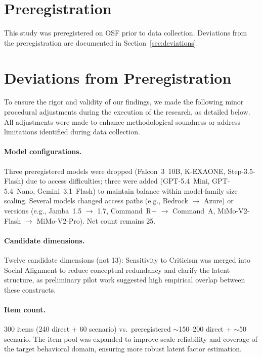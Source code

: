 \documentclass[11pt]{article}
\begin{document}
\section*{Preregistration}

This study was preregistered on OSF prior to data collection.
Deviations from the preregistration are documented in Section~\ref{sec:deviations}.


\section*{Deviations from Preregistration}
\label{sec:deviations}

To ensure the rigor and validity of our findings, we made the following minor procedural adjustments during the execution of the research, as detailed below. All adjustments were made to enhance methodological soundness or address limitations identified during data collection.

\paragraph{Model configurations.}
Three preregistered models were dropped (Falcon~3~10B, K-EXAONE, Step-3.5-Flash) due to access difficulties; three were added (GPT-5.4~Mini, GPT-5.4~Nano, Gemini~3.1~Flash) to maintain balance within model-family size scaling.
Several models changed access paths (e.g., Bedrock $\to$ Azure) or versions (e.g., Jamba~1.5 $\to$ 1.7, Command~R+ $\to$ Command~A, MiMo-V2-Flash $\to$ MiMo-V2-Pro).
Net count remains 25.

\paragraph{Candidate dimensions.}
Twelve candidate dimensions (not 13): Sensitivity to Criticism was merged into Social Alignment to reduce conceptual redundancy and clarify the latent structure, as preliminary pilot work suggested high empirical overlap between these constructs.

\paragraph{Item count.}
300 items (240 direct + 60 scenario) vs.\ preregistered $\sim$150–200 direct + $\sim$50 scenario. The item pool was expanded to improve scale reliability and coverage of the target behavioral domain, ensuring more robust latent factor estimation.
\end{document}
